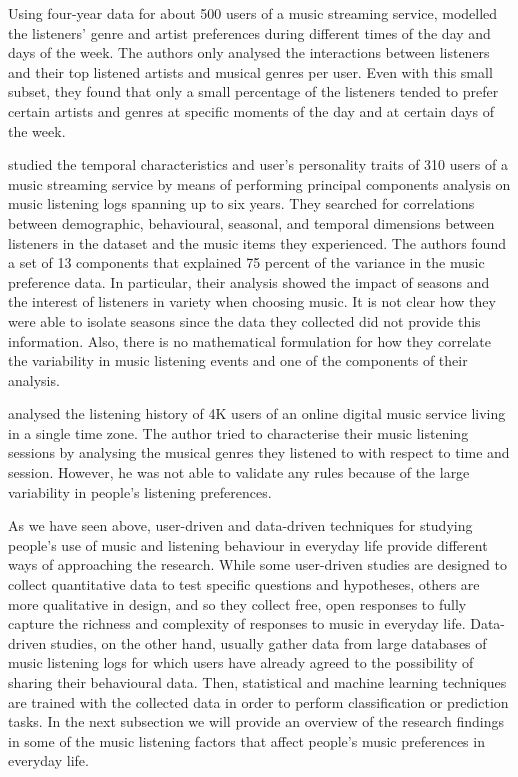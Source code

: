 Using four-year data for about 500 users of a music streaming service, \textcite{herrera10rocking} modelled the listeners' genre and artist preferences during different times of the day and days of the week. The authors only analysed the interactions between listeners and their top listened artists and musical genres per user. Even with this small subset, they found that only a small percentage of the listeners tended to prefer certain artists and genres at specific moments of the day and at certain days of the week. 

\textcite{baur12listening} studied the temporal characteristics and user's personality traits of 310 users of a music streaming service by means of performing principal components analysis on music listening logs spanning up to six years. They searched for correlations between demographic, behavioural, seasonal, and temporal dimensions between listeners in the dataset and the music items they experienced. The authors found a set of 13 components that explained 75 percent of the variance in the music preference data. 
In particular, their analysis showed the impact of seasons and the interest of listeners in variety when choosing music. It is not clear how they were able to isolate seasons since the data they collected did not provide this information. Also, there is no mathematical formulation for how they correlate the variability in music listening events and one of the components of their analysis.

\textcite{teixeira12towards} analysed the listening history of 4K users of an online digital music service living in a single time zone. The author tried to characterise their music listening sessions by analysing the musical genres they listened to with respect to time and session. However, he was not able to validate any rules because of the large variability in people's listening preferences.






As we have seen above, user-driven and data-driven techniques for studying people's use of music and listening behaviour in everyday life provide different ways of approaching the research. 
While some user-driven studies are designed to collect quantitative data to test specific questions and hypotheses, others are more qualitative in design, and so they collect free, open responses to fully capture the richness and complexity of responses to music in everyday life. 
Data-driven studies, on the other hand, usually gather data from large databases of music listening logs for which users have already agreed to the possibility of sharing their behavioural data.
Then, statistical and machine learning techniques are trained with the collected data in order to perform classification or prediction tasks.  
In the next subsection we will provide an overview of the research findings in some of the music listening factors that affect people's music preferences in everyday life.


